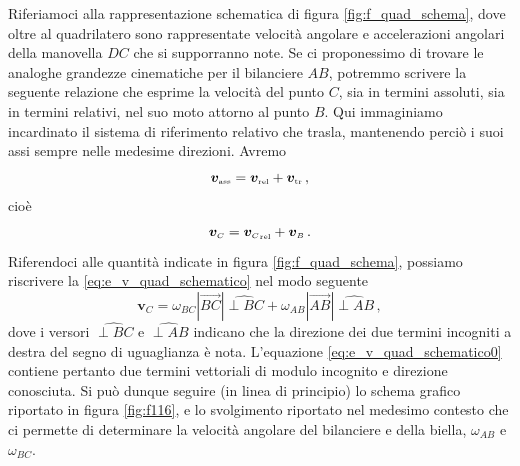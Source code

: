 \noindent Riferiamoci alla rappresentazione schematica di figura
\ref{fig:f_quad_schema}, dove oltre al quadrilatero sono rappresentate velocit\`a
angolare e accelerazioni angolari della manovella $DC$ che si supporranno note.
Se ci proponessimo di trovare le analoghe grandezze cinematiche per il bilanciere $AB$,
potremmo scrivere la seguente relazione che esprime la velocit\`a del punto $C$,
sia in termini assoluti, sia in termini relativi, nel suo moto attorno al
punto $B$. Qui immaginiamo incardinato il sistema di riferimento relativo che
trasla, mantenendo perci\`o i suoi assi sempre nelle medesime direzioni.
Avremo
\begin{equation}
{\bm v}_{\scriptscriptstyle{{\rm ass}}}=
{\bm v}_{\scriptscriptstyle{{\rm rel}}}+
{\bm v}_{\scriptscriptstyle{{\rm tr}}}\,,
\label{eq:e_v_rivals_q}
\end{equation}
\noindent cio\`e
\begin{equation}
{{\bm v}_{\scriptscriptstyle{C}}}=
{{\bm v}_{\scriptscriptstyle{C}}}_{\scriptscriptstyle{{\rm rel}}}+
{{\bm v}_{\scriptscriptstyle{B}}}\,.
\label{eq:e_v_quad_schematico}
\end{equation}
\noindent Riferendoci alle quantit\`a indicate in figura \ref{fig:f_quad_schema},
possiamo riscrivere la \ref{eq:e_v_quad_schematico} nel modo seguente
\begin{equation}
{{\bm v}_{\scriptscriptstyle{C}}}=
\omega_{\scriptscriptstyle{BC}} |\overrightarrow{BC}| \widehat{{\perp{BC}}}
+\omega_{\scriptscriptstyle{AB}} |\overrightarrow{AB}| \widehat{{\perp{AB}}}\,,
\label{eq:e_v_quad_schematico0}
\end{equation}
\noindent dove i versori
$\widehat{{\perp{BC}}}$ e $\widehat{{\perp{AB}}}$ indicano che la direzione dei
due termini incogniti a destra del segno di uguaglianza \`e nota.
L'equazione \ref{eq:e_v_quad_schematico0} contiene pertanto due 
termini vettoriali di modulo incognito e direzione conosciuta.
Si pu\`o dunque seguire (in linea di principio) lo schema grafico riportato in figura
\ref{fig:f116}, e lo svolgimento riportato nel medesimo contesto che ci permette 
di determinare la velocit\`a angolare del bilanciere e della biella,
$\omega_{\scriptscriptstyle{AB}}$ e $\omega_{\scriptscriptstyle{BC}}$.


